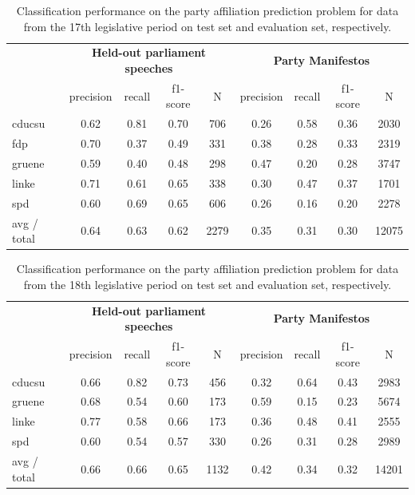 \documentclass[runningheads,a4paper]{llncs}
\begin{document}
\begin{table}[t]
\begin{center}
\begin{tabular}{lcccccccc}
& \multicolumn{4}{c}{\bf Held-out parliament speeches} & \multicolumn{4}{c}{\bf Party Manifestos}\\
    &         precision    &recall &  f1-score  & N    &         precision    &recall &  f1-score  & N\\
\hline \hline
       cducsu   &    0.62  &    0.81  &    0.70  &     706&0.26    &  0.58   &   0.36    &  2030\\
        fdp    &   0.70   &   0.37  &    0.49    &   331&0.38   &   0.28    &  0.33   &   2319\\
     gruene &      0.59  &    0.40   &   0.48   &    298&0.47  &    0.20   &   0.28 &     3747\\
      linke    &   0.71   &   0.61  &    0.65    &   338&0.30   &   0.47   &   0.37    &  1701\\
        spd   &    0.60   &   0.69  &    0.65   &    606&0.26   &   0.16   &   0.20  &    2278\\
\hline
avg / total &      0.64   &   0.63   &   0.62    &  2279 &0.35    &  0.31 &     0.30   &  12075
%
\end{tabular}
\end{center}
\caption{
\label{tab:results_17}
Classification performance on the party affiliation prediction problem for data from the 17th legislative period on test set and evaluation set, respectively.
}
\end{table}

\begin{table}[t]
\begin{center}
\begin{tabular}{lcccccccc}
& \multicolumn{4}{c}{\bf Held-out parliament speeches} & \multicolumn{4}{c}{\bf Party Manifestos}\\
    &         precision    &recall &  f1-score  & N    &         precision    &recall &  f1-score  & N\\
\hline \hline
    cducsu    &   0.66   &   0.82   &   0.73    &   456 & 0.32  &    0.64  &    0.43    &  2983\\
     gruene   &    0.68    &  0.54   &   0.60    &   173   &0.59   &   0.15   &   0.23   &   5674\\
      linke     &  0.77  &    0.58    &  0.66    &   173 & 0.36   &   0.48   &   0.41   &   2555\\
        spd     &  0.60  &    0.54   &   0.57    &   330 & 0.26 &     0.31   &   0.28     & 2989\\
\hline
avg / total    &   0.66  &    0.66  &    0.65   &   1132&  0.42 &     0.34  &    0.32&     14201\\
%
\end{tabular}
\end{center}
\caption{
\label{tab:results_18}
Classification performance on the party affiliation prediction problem for data from the 18th legislative period on test set and evaluation set, respectively. 
}
\end{table}
\end{document}
